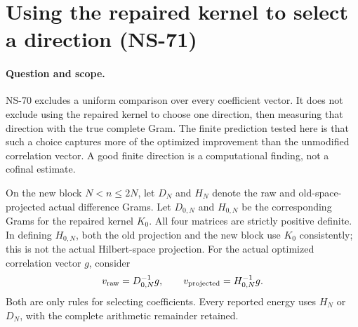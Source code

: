 \section{Using the repaired kernel to select a direction (NS-71)}
\label{sec:ns71-selected-preconditioner}

\paragraph{Question and scope.}
NS-70 excludes a uniform comparison over every coefficient vector.
It does not exclude using the repaired kernel to choose one direction,
then measuring that direction with the true complete Gram. The finite
prediction tested here is that such a choice captures more of the
optimized improvement than the unmodified correlation vector. A good
finite direction is a computational finding, not a cofinal estimate.

On the new block $N<n\leq2N$, let $D_N$ and $H_N$ denote the raw
and old-space-projected actual difference Grams. Let $D_{0,N}$ and
$H_{0,N}$ be the corresponding Grams for the repaired kernel $K_0$.
All four matrices are strictly positive definite. In defining $H_{0,N}$,
both the old projection and the new block use $K_0$ consistently;
this is not the actual Hilbert-space projection.
For the actual optimized correlation vector $g$, consider
\[
 v_{\rm raw}=D_{0,N}^{-1}g,\qquad
 v_{\rm projected}=H_{0,N}^{-1}g.
\]
Both are only rules for selecting coefficients. Every reported energy
uses $H_N$ or $D_N$, with the complete arithmetic remainder retained.

